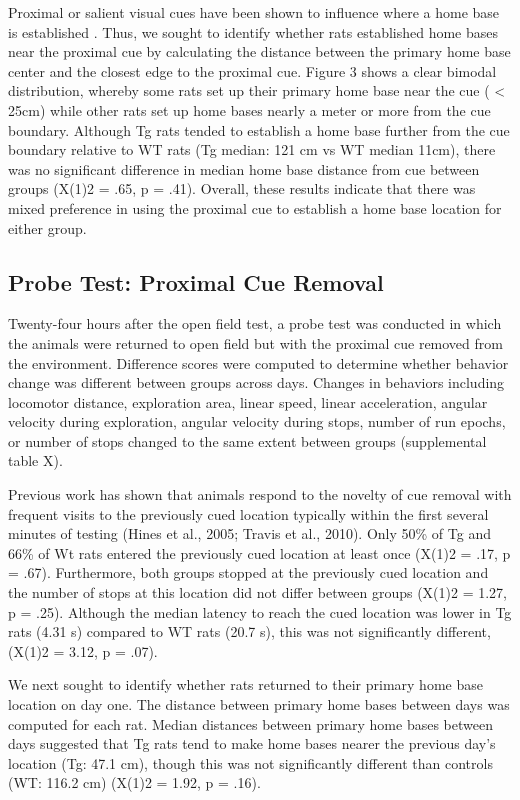 \documentclass[fleqn,10pt]{wlscirep}
\begin{document}
Proximal or salient visual cues have been shown to influence where a home base is established \cite{nemati_point_2007,hines_home_2005}. Thus, we sought to identify whether rats established home bases near the proximal cue by calculating the distance between the primary home base center and the closest edge to the proximal cue. Figure 3 shows a clear bimodal distribution, whereby some rats set up their primary home base near the cue ( < 25cm) while other rats set up home bases nearly a meter or more from the cue boundary. Although Tg rats tended to establish a home base further from the cue boundary relative to WT rats (Tg median: 121 cm vs WT median 11cm), there was no significant difference in median home base distance from cue between groups  (X(1)2 = .65, p = .41). Overall, these results indicate that there was mixed preference in using the proximal cue to establish a home base location for either group. 


\subsection*{Probe Test: Proximal Cue Removal}
Twenty-four hours after the open field test, a probe test was conducted in which the animals were returned to open field but with the proximal cue removed from the environment. Difference scores were computed to determine whether behavior change was different between groups across days. Changes in behaviors including locomotor distance, exploration area, linear speed, linear acceleration, angular velocity during exploration, angular velocity during stops, number of run epochs, or number of stops changed to the same extent between groups (supplemental table X). 

Previous work has shown that animals respond to the novelty of cue removal with frequent visits to the previously cued location typically within the first several minutes of testing \cite{hines_home_2005}(Hines et al., 2005; Travis et al., 2010). Only 50\% of Tg and 66\% of Wt rats entered the previously cued location at least once (X(1)2 = .17, p = .67). Furthermore, both groups stopped at the previously cued location and the number of stops at this location did not differ between groups (X(1)2 = 1.27, p = .25). Although the median latency to reach the cued location was lower in Tg rats (4.31 s) compared to WT rats (20.7 s), this was not significantly different, (X(1)2 = 3.12, p = .07). 

We next sought to identify whether rats returned to their primary home base location on day one. The distance between primary home bases between days was computed for each rat. Median distances between primary home bases between days suggested that Tg rats tend to make home bases nearer the previous day’s location (Tg: 47.1 cm), though this was not significantly different than controls (WT: 116.2 cm) (X(1)2 = 1.92, p = .16). 
\end{document}
